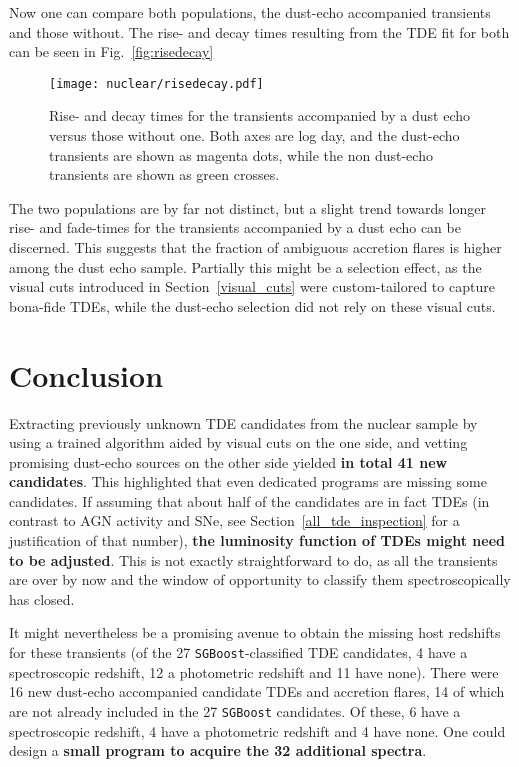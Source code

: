 Now one can compare both populations, the dust-echo accompanied transients and those without. The rise- and decay times resulting from the TDE fit for both can be seen in Fig.~\ref{fig:risedecay}

\begin{figure}[h!]
  \texttt{[image: nuclear/risedecay.pdf]}
  \caption[Dust and non-dust echo rise- and decay times]{Rise- and decay times for the transients accompanied by a dust echo versus those without one. Both axes are log day, and the dust-echo transients are shown as magenta dots, while the non dust-echo transients are shown as green crosses.}
\end{figure}
The two populations are by far not distinct, but a slight trend towards longer rise- and fade-times for the transients accompanied by a dust echo can be discerned. This suggests that the fraction of ambiguous accretion flares is higher among the dust echo sample. Partially this might be a selection effect, as the visual cuts introduced in Section~\ref{visual_cuts} were custom-tailored to capture bona-fide TDEs, while the dust-echo selection did not rely on these visual cuts.

\section{Conclusion}
Extracting previously unknown TDE candidates from the nuclear sample by using a trained algorithm aided by visual cuts on the one side, and vetting promising dust-echo sources on the other side yielded \textbf{in total 41 new candidates}. This highlighted that even dedicated programs are missing some candidates. If assuming that about half of the candidates are in fact TDEs (in contrast to AGN activity and SNe, see Section~\ref{all_tde_inspection} for a justification of that number), \textbf{the luminosity function of TDEs might need to be adjusted}. This is not exactly straightforward to do, as all the transients are over by now and the window of opportunity to classify them spectroscopically has closed.

It might nevertheless be a promising avenue to obtain the missing host redshifts for these transients (of the 27 \texttt{SGBoost}-classified TDE candidates, 4 have a spectroscopic redshift, 12 a photometric redshift and 11 have none). There were 16 new dust-echo accompanied candidate TDEs and accretion flares, 14 of which are not already included in the 27 \texttt{SGBoost} candidates. Of these, 6 have a spectroscopic redshift, 4 have a photometric redshift and 4 have none. One could design a \textbf{small program to acquire the 32 additional spectra}.

